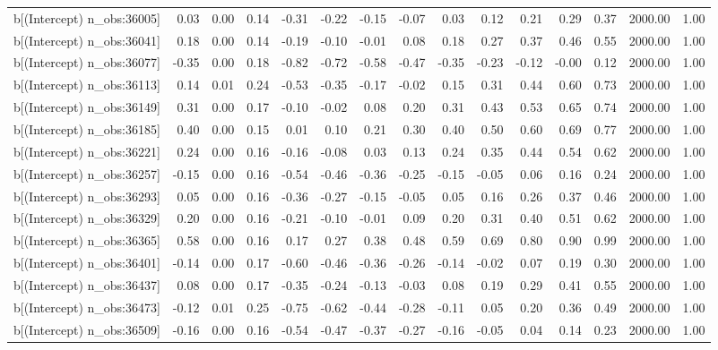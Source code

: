 \begin{table}[ht]
\begin{tabular}{rrrrrrrrrrrrrrr}
  b[(Intercept) n\_obs:36005] & 0.03 & 0.00 & 0.14 & -0.31 & -0.22 & -0.15 & -0.07 & 0.03 & 0.12 & 0.21 & 0.29 & 0.37 & 2000.00 & 1.00 \\ 
  b[(Intercept) n\_obs:36041] & 0.18 & 0.00 & 0.14 & -0.19 & -0.10 & -0.01 & 0.08 & 0.18 & 0.27 & 0.37 & 0.46 & 0.55 & 2000.00 & 1.00 \\ 
  b[(Intercept) n\_obs:36077] & -0.35 & 0.00 & 0.18 & -0.82 & -0.72 & -0.58 & -0.47 & -0.35 & -0.23 & -0.12 & -0.00 & 0.12 & 2000.00 & 1.00 \\ 
  b[(Intercept) n\_obs:36113] & 0.14 & 0.01 & 0.24 & -0.53 & -0.35 & -0.17 & -0.02 & 0.15 & 0.31 & 0.44 & 0.60 & 0.73 & 2000.00 & 1.00 \\ 
  b[(Intercept) n\_obs:36149] & 0.31 & 0.00 & 0.17 & -0.10 & -0.02 & 0.08 & 0.20 & 0.31 & 0.43 & 0.53 & 0.65 & 0.74 & 2000.00 & 1.00 \\ 
  b[(Intercept) n\_obs:36185] & 0.40 & 0.00 & 0.15 & 0.01 & 0.10 & 0.21 & 0.30 & 0.40 & 0.50 & 0.60 & 0.69 & 0.77 & 2000.00 & 1.00 \\ 
  b[(Intercept) n\_obs:36221] & 0.24 & 0.00 & 0.16 & -0.16 & -0.08 & 0.03 & 0.13 & 0.24 & 0.35 & 0.44 & 0.54 & 0.62 & 2000.00 & 1.00 \\ 
  b[(Intercept) n\_obs:36257] & -0.15 & 0.00 & 0.16 & -0.54 & -0.46 & -0.36 & -0.25 & -0.15 & -0.05 & 0.06 & 0.16 & 0.24 & 2000.00 & 1.00 \\ 
  b[(Intercept) n\_obs:36293] & 0.05 & 0.00 & 0.16 & -0.36 & -0.27 & -0.15 & -0.05 & 0.05 & 0.16 & 0.26 & 0.37 & 0.46 & 2000.00 & 1.00 \\ 
  b[(Intercept) n\_obs:36329] & 0.20 & 0.00 & 0.16 & -0.21 & -0.10 & -0.01 & 0.09 & 0.20 & 0.31 & 0.40 & 0.51 & 0.62 & 2000.00 & 1.00 \\ 
  b[(Intercept) n\_obs:36365] & 0.58 & 0.00 & 0.16 & 0.17 & 0.27 & 0.38 & 0.48 & 0.59 & 0.69 & 0.80 & 0.90 & 0.99 & 2000.00 & 1.00 \\ 
  b[(Intercept) n\_obs:36401] & -0.14 & 0.00 & 0.17 & -0.60 & -0.46 & -0.36 & -0.26 & -0.14 & -0.02 & 0.07 & 0.19 & 0.30 & 2000.00 & 1.00 \\ 
  b[(Intercept) n\_obs:36437] & 0.08 & 0.00 & 0.17 & -0.35 & -0.24 & -0.13 & -0.03 & 0.08 & 0.19 & 0.29 & 0.41 & 0.55 & 2000.00 & 1.00 \\ 
  b[(Intercept) n\_obs:36473] & -0.12 & 0.01 & 0.25 & -0.75 & -0.62 & -0.44 & -0.28 & -0.11 & 0.05 & 0.20 & 0.36 & 0.49 & 2000.00 & 1.00 \\ 
  b[(Intercept) n\_obs:36509] & -0.16 & 0.00 & 0.16 & -0.54 & -0.47 & -0.37 & -0.27 & -0.16 & -0.05 & 0.04 & 0.14 & 0.23 & 2000.00 & 1.00 \\ 

\end{tabular}
\end{table}
